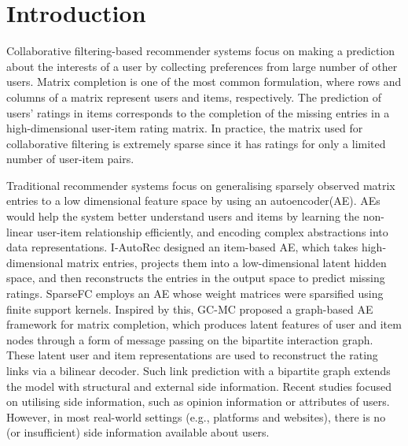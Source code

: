\documentclass[sigconf]{acmart}
\begin{document}


\maketitle

\section{Introduction}
Collaborative filtering-based recommender systems focus on making a prediction about the interests of a user by collecting preferences from large number of other users. Matrix completion\cite{candes2009exact} is one of the most common formulation, where rows and columns of a matrix represent users and items, respectively. The prediction of users' ratings in items corresponds to the completion of the missing entries in a high-dimensional user-item rating matrix. In practice, the matrix used for collaborative filtering is extremely sparse since it has ratings for only a limited number of user-item pairs.

Traditional recommender systems focus on generalising sparsely observed matrix entries to a low dimensional feature space by using an autoencoder(AE)\cite{zhang2020survey}. AEs would help the system better understand users and items by learning the non-linear user-item relationship efficiently, and encoding complex abstractions into data representations. I-AutoRec\cite{sedhain2015autorec} designed an item-based AE, which takes high-dimensional matrix entries, projects them into a low-dimensional latent hidden space, and then reconstructs the entries in the output space to predict missing ratings. SparseFC\cite{muller2018kernelized} employs an AE whose weight matrices were sparsified using finite support kernels. Inspired by this, GC-MC\cite{berg2018graph} proposed a graph-based AE framework for matrix completion, which produces latent features of user and item nodes through a form of message passing on the bipartite interaction graph. These latent user and item representations are used to reconstruct the rating links via a bilinear decoder. Such link prediction with a bipartite graph extends the model with structural and external side information. Recent studies \cite{rashed2019attribute, strahl2020scalable, ugla2020interpretable} focused on utilising side information, such as opinion information or attributes of users. However, in most real-world settings (e.g., platforms and websites), there is no (or insufficient) side information available about users.
\end{document}
